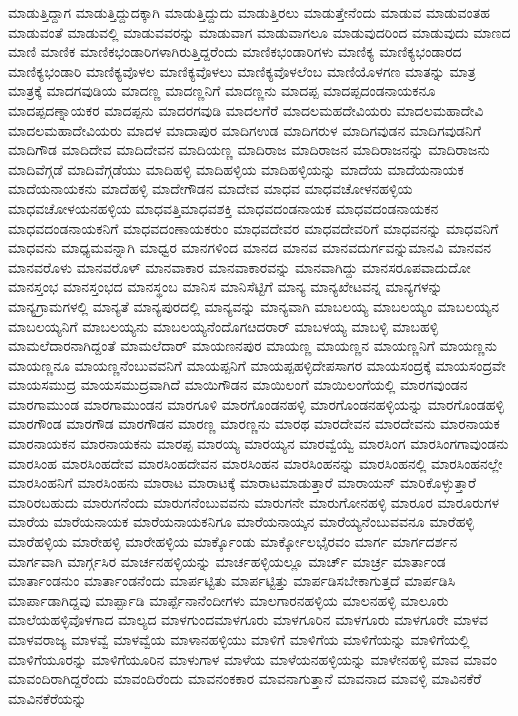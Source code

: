 {ಮಾಡುತ್ತಿದ್ದಾಗ
ಮಾಡುತ್ತಿದ್ದುದಕ್ಕಾಗಿ
ಮಾಡುತ್ತಿದ್ದುದು
ಮಾಡುತ್ತಿರಲು
ಮಾಡುತ್ತೇನೆಂದು
ಮಾಡುವ
ಮಾಡುವಂತಹ
ಮಾಡುವಂತೆ
ಮಾಡುವಲ್ಲಿ
ಮಾಡುವವರನ್ನು
ಮಾಡುವಾಗ
ಮಾಡುವಾಗಲೂ
ಮಾಡುವುದರಿಂದ
ಮಾಡುವುದು
ಮಾಣದ
ಮಾಣಿ
ಮಾಣಿಕ
ಮಾಣಿಕಭಂಡಾರಿಗಳಾಗಿರುತ್ತಿದ್ದರೆಂದು
ಮಾಣಿಕಭಂಡಾರಿಗಳು
ಮಾಣಿಕ್ಯ
ಮಾಣಿಕ್ಯಭಂಡಾರದ
ಮಾಣಿಕ್ಯಭಂಡಾರಿ
ಮಾಣಿಕ್ಯವೊಳಲ
ಮಾಣಿಕ್ಯವೊಳಲು
ಮಾಣಿಕ್ಯವೊಳಲೆಂಬ
ಮಾಣಿಯೊಳಗಣ
ಮಾತನ್ನು
ಮಾತ್ರ
ಮಾತ್ರಕ್ಕೆ
ಮಾದಗವುಡಿಯ
ಮಾದಣ್ಣ
ಮಾದಣ್ಣನಿಗೆ
ಮಾದಣ್ಣನು
ಮಾದಪ್ಪ
ಮಾದಪ್ಪದಂಡನಾಯಕನೂ
ಮಾದಪ್ಪದಣ್ನಾಯಕರ
ಮಾದಪ್ಪನು
ಮಾದರಗವುಡಿ
ಮಾದಲಗೆರೆ
ಮಾದಲಮಹದೇವಿಯರು
ಮಾದಲಮಹಾದೇವಿ
ಮಾದಲಮಹಾದೇವಿಯರು
ಮಾದಳ
ಮಾದಾಪುರ
ಮಾದಿಗಉಡ
ಮಾದಿಗರುಳ
ಮಾದಿಗವುಡನ
ಮಾದಿಗವುಡನಿಗೆ
ಮಾದಿಗೌಡ
ಮಾದಿದೇವ
ಮಾದಿದೇವನ
ಮಾದಿಯಣ್ಣ
ಮಾದಿರಾಜ
ಮಾದಿರಾಜನ
ಮಾದಿರಾಜನನ್ನು
ಮಾದಿರಾಜನು
ಮಾದಿವೆಗ್ಗಡೆ
ಮಾದಿವೆಗ್ಗಡೆಯು
ಮಾದಿಹಳ್ಳಿ
ಮಾದಿಹಳ್ಳಿಯ
ಮಾದಿಹಳ್ಳಿಯನ್ನು
ಮಾದೆಯ
ಮಾದೆಯನಾಯಕ
ಮಾದೆಯನಾಯಕನು
ಮಾದೆಹಳ್ಳಿ
ಮಾದೇಗೌಡನ
ಮಾದೇವ
ಮಾಧವ
ಮಾಧವಚೋಳನಹಳ್ಳಿಯ
ಮಾಧವಚೋಳಯನಹಳ್ಳಿಯ
ಮಾಧವತ್ತಿಮಾಧವಶಕ್ತಿ
ಮಾಧವದಂಡನಾಯಕ
ಮಾಧವದಂಡನಾಯಕನ
ಮಾಧವದಂಡನಾಯಕನಿಗೆ
ಮಾಧವದಂಣಾಯಕರುಂ
ಮಾಧವದೇವರ
ಮಾಧವದೇವರಿಗೆ
ಮಾಧವನನ್ನು
ಮಾಧವನಿಗೆ
ಮಾಧವನು
ಮಾಧ್ಯಮವನ್ನಾಗಿ
ಮಾಧ್ವರ
ಮಾನಗಳಿಂದ
ಮಾನದ
ಮಾನವ
ಮಾನವದುರ್ಗವನ್ನುಮಾನವಿ
ಮಾನವನ
ಮಾನವರೊಳು
ಮಾನವರೊಳ್
ಮಾನವಾಕಾರ
ಮಾನವಾಕಾರವನ್ನು
ಮಾನವಾಗಿದ್ದು
ಮಾನಸರೂಪವಾದುದೋ
ಮಾನಸ್ತಂಭ
ಮಾನಸ್ತಂಭದ
ಮಾನಸ್ಥಂಬ
ಮಾನಿಸ
ಮಾನಿಸೆಟ್ಟಿಗೆ
ಮಾನ್ಯ
ಮಾನ್ಯಖೇಟವನ್ನ
ಮಾನ್ಯಗಳನ್ನು
ಮಾನ್ಯಗ್ರಾಮಗಳಲ್ಲಿ
ಮಾನ್ಯತೆ
ಮಾನ್ಯಪುರದಲ್ಲಿ
ಮಾನ್ಯವನ್ನು
ಮಾನ್ಯವಾಗಿ
ಮಾಬಲಯ್ಯ
ಮಾಬಲಯ್ಯಂ
ಮಾಬಲಯ್ಯನ
ಮಾಬಲಯ್ಯನಿಗೆ
ಮಾಬಲಯ್ಯನು
ಮಾಬಲಯ್ಯನೆಂದೊಗೞದರಾರ್
ಮಾಬಳಯ್ಯ
ಮಾಬಳ್ಳಿ
ಮಾಬಹಳ್ಳಿ
ಮಾಮಲೆದಾರನಾಗಿದ್ದಂತೆ
ಮಾಮಲೆದಾರ್
ಮಾಯಣನಪುರ
ಮಾಯಣ್ಣ
ಮಾಯಣ್ಣನ
ಮಾಯಣ್ಣನಿಗೆ
ಮಾಯಣ್ಣನು
ಮಾಯಣ್ಣನೂ
ಮಾಯಣ್ಣನೆಂಬುವವನಿಗೆ
ಮಾಯಪ್ಪನಿಗೆ
ಮಾಯಪ್ಪಹಳ್ಳಿದೇಪಸಾಗರ
ಮಾಯಸಂದ್ರಕ್ಕೆ
ಮಾಯಸಂದ್ರವೇ
ಮಾಯಸಮುದ್ರ
ಮಾಯಸಮುದ್ರವಾಗಿದೆ
ಮಾಯಿಗೌಡನ
ಮಾಯಿಲಂಗೆ
ಮಾಯಿಲಂಗೆಯಲ್ಲಿ
ಮಾರಗವುಂಡನ
ಮಾರಗಾಮುಂಡ
ಮಾರಗಾಮುಂಡನ
ಮಾರಗೂಳಿ
ಮಾರಗೊಂಡನಹಳ್ಳಿ
ಮಾರಗೊಂಡನಹಳ್ಳಿಯನ್ನು
ಮಾರಗೊಂಡಹಳ್ಳಿ
ಮಾರಗೌಂಡ
ಮಾರಗೌಡ
ಮಾರಗೌಡನ
ಮಾರಣ್ಣ
ಮಾರಣ್ಣನು
ಮಾರಥ
ಮಾರದೇವನ
ಮಾರದೇವನು
ಮಾರನಾಯಕ
ಮಾರನಾಯಕನ
ಮಾರನಾಯಕನು
ಮಾರಪ್ಪ
ಮಾರಯ್ಯ
ಮಾರಯ್ಯನ
ಮಾರವ್ವೆಯ್ವೆ
ಮಾರಸಿಂಗ
ಮಾರಸಿಂಗಗಾವುಂಡನು
ಮಾರಸಿಂಹ
ಮಾರಸಿಂಹದೇವ
ಮಾರಸಿಂಹದೇವನ
ಮಾರಸಿಂಹನ
ಮಾರಸಿಂಹನನ್ನು
ಮಾರಸಿಂಹನಲ್ಲಿ
ಮಾರಸಿಂಹನಲ್ಲೇ
ಮಾರಸಿಂಹನಿಗೆ
ಮಾರಸಿಂಹನು
ಮಾರಾಟ
ಮಾರಾಟಕ್ಕೆ
ಮಾರಾಟಮಾಡುತ್ತಾರೆ
ಮಾರಾಯನ್
ಮಾರಿಕೊಳ್ಳುತ್ತಾರೆ
ಮಾರಿರಬಹುದು
ಮಾರುಗನೆಂದು
ಮಾರುಗನೆಂಬುವವನು
ಮಾರುಗನೇ
ಮಾರುಗೋನಹಳ್ಳಿ
ಮಾರೂರ
ಮಾರೂರುಗಳ
ಮಾರೆಯ
ಮಾರೆಯನಾಯಕ
ಮಾರೆಯನಾಯಕನಿಗೂ
ಮಾರೆಯನಾಯ್ಕನ
ಮಾರೆಯ್ಯನೆಂಬುವವನೂ
ಮಾರೆಹಳ್ಳಿ
ಮಾರೆಹಳ್ಳಿಯ
ಮಾರೇಹಳ್ಳಿ
ಮಾರೇಹಳ್ಳಿಯ
ಮಾರ್ಕ್ಕೊಂಡು
ಮಾರ್ಕ್ಕೋಲಭೈರವಂ
ಮಾರ್ಗ
ಮಾರ್ಗದರ್ಶನ
ಮಾರ್ಗವಾಗಿ
ಮಾರ್ಗ್ಗಸಿರ
ಮಾರ್ಚನಹಳ್ಳಿಯನ್ನು
ಮಾರ್ಚಹಳ್ಳಿಯಲ್ಲೂ
ಮಾರ್ಚ್
ಮಾರ್ಚ್ರ
ಮಾರ್ತಾಂಡ
ಮಾರ್ತಾಂಡನುಂ
ಮಾರ್ತಾಂಡನೆಂದು
ಮಾರ್ಪಟ್ಟಿತು
ಮಾರ್ಪಟ್ಟಿತ್ತು
ಮಾರ್ಪಡಿಸಬೇಕಾಗುತ್ತದೆ
ಮಾರ್ಪಡಿಸಿ
ಮಾರ್ಪಾಡಾಗಿದ್ದವು
ಮಾರ್ಪ್ಪಾಡಿ
ಮಾರ್ಪ್ಪೆನಾನೆಂದೀಗಳು
ಮಾಲಗಾರನಹಳ್ಳಿಯ
ಮಾಲನಹಳ್ಳಿ
ಮಾಲೂರು
ಮಾಲೆಯಹಳ್ಳಿವೊಳಗಾದ
ಮಾಲ್ಯದ
ಮಾಳಗುಂದಮಾಳಗೂರು
ಮಾಳಗೂರಿನ
ಮಾಳಗೂರು
ಮಾಳಗೂರೇ
ಮಾಳವ
ಮಾಳವರಾಜ್ಯ
ಮಾಳವ್ವೆ
ಮಾಳವ್ವೆಯ
ಮಾಳಾನಹಳ್ಳಿಯು
ಮಾಳಿಗೆ
ಮಾಳಿಗೆಯ
ಮಾಳಿಗೆಯನ್ನು
ಮಾಳಿಗೆಯಲ್ಲಿ
ಮಾಳಿಗೆಯೂರನ್ನು
ಮಾಳಿಗೆಯೂರಿನ
ಮಾಳುಗಾಳ
ಮಾಳೆಯ
ಮಾಳೆಯನಹಳ್ಳಿಯನ್ನು
ಮಾಳೇನಹಳ್ಳಿ
ಮಾವ
ಮಾವಂ
ಮಾವಂದಿರಾಗಿದ್ದರೆಂದು
ಮಾವಂದಿರೆಂದು
ಮಾವನಂಕಕಾರ
ಮಾವನಾಗುತ್ತಾನೆ
ಮಾವನಾದ
ಮಾವಳ್ಳಿ
ಮಾವಿನಕೆರೆ
ಮಾವಿನಕೆರೆಯನ್ನು
}
